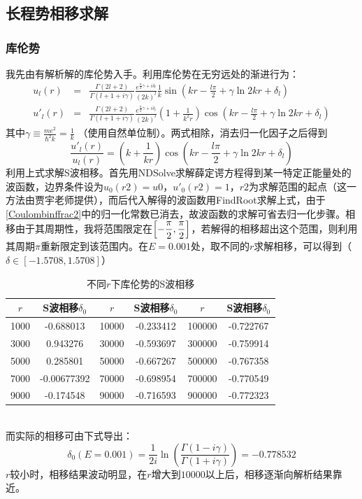 \documentclass[hyperref,cs4size,titlepage,twoside]{ctexart}
\begin{document}
\subsection{长程势相移求解}
\subsubsection{库伦势}
我先由有解析解的库伦势入手。利用库伦势在无穷远处的渐进行为\cite{Jinyan}：
\begin{eqnarray}\label{Coulombinf2}
  u_l(r)&=&\frac{\Gamma(2l+2)}{\Gamma(l+1+i\gamma)}\frac{e^{\frac{\pi}{2}\gamma+i\delta_l}}{(2k)^l}\frac{1}{k}\sin(kr-\frac{l\pi}{2}+\gamma\ln2kr+\delta_l)\\
  u'_l(r)&=&\frac{\Gamma(2l+2)}{\Gamma(l+1+i\gamma)}\frac{e^{\frac{\pi}{2}\gamma+i\delta_l}}{(2k)^l}(1+\frac{1}{k^2r})\cos(kr-\frac{l\pi}{2}+\gamma\ln2kr+\delta_l)
\end{eqnarray}
其中$\displaystyle\gamma\equiv\frac{me^2}{\hbar^2k}=\frac{1}{k}$ （使用自然单位制）。两式相除，消去归一化因子之后得到
\begin{equation}\label{Coulombinffrac2}
  \frac{u'_l(r)}{u_l(r)}=(k+\frac{1}{kr})\cos(kr-\frac{l\pi}{2}+\gamma\ln2kr+\delta_l)
\end{equation}
利用上式求解S波相移。首先用NDSolve求解薛定谔方程得到某一特定正能量处的波函数，边界条件设为$u_0(r2)=u0$，$u'_0(r2)=1$，$r2$为求解范围的起点（这一方法由贾宇老师提供），而后代入解得的波函数用FindRoot求解上式，由于\eqref{Coulombinffrac2}中的归一化常数已消去，故波函数的求解可省去归一化步骤。相移由于其周期性，我将范围限定在$\displaystyle\bqty{-\frac{\pi}{2},\frac{\pi}{2}}$，若解得的相移超出这个范围，则利用其周期$\pi$重新限定到该范围内。在$E=0.001$处，取不同的$r$求解相移，可以得到（$\delta\in[-1.5708,1.5708]$）
\begin{table}[!htbp]
  \centering
  \begin{tabular}{|cccccc|}
    \hline
    $r$&S波相移$\delta_0$&$r$&S波相移$\delta_0$&$r$&S波相移$\delta_0$\\
    \hline
    1000&-0.688013&10000&-0.233412&100000&-0.722767\\
    3000&0.943276&30000&-0.593697&300000&-0.759914\\
    5000&0.285801&50000&-0.667267&500000&-0.767358\\
    7000&-0.00677392&70000&-0.698954&700000&-0.770549\\
    9000&-0.174548&90000&-0.716593&900000&-0.772323\\
    \hline
  \end{tabular}
  \caption{不同$r$下库伦势的S波相移}
\end{table}\\
而实际的相移可由下式导出：
\begin{equation}\label{delta0true0.001}
  \delta_0(E=0.001)=\frac{1}{2 i}\ln \left(\frac{\Gamma \left(1-i\gamma\right)}{\Gamma \left(1+i\gamma\right)}\right)=-0.778532
\end{equation}
$r$较小时，相移结果波动明显，在$r$增大到$10000$以上后，相移逐渐向解析结果靠近。
\end{document}
